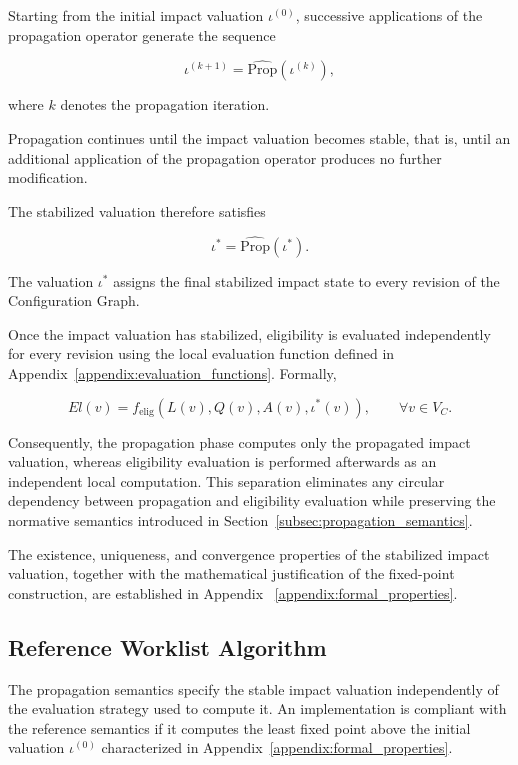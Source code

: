 \documentclass[10pt]{article}
\begin{document}
Starting from the initial impact valuation $\iota^{(0)}$, successive applications of the propagation operator generate the sequence

\begin{equation}
	\label{eq:impact_iteration}
	\iota^{(k+1)}
	=
	\widehat{\mathrm{Prop}}
	\!\left(
	\iota^{(k)}
	\right),
\end{equation}

where $k$ denotes the propagation iteration.

Propagation continues until the impact valuation becomes stable, that is, until an additional application of the propagation operator produces no further modification.

The stabilized valuation therefore satisfies

\begin{equation}
	\label{eq:impact_fixed_point}
	\iota^{*}
	=
	\widehat{\mathrm{Prop}}
	\!\left(
	\iota^{*}
	\right).
\end{equation}

The valuation $\iota^{*}$ assigns the final stabilized impact state to every
revision of the Configuration Graph.

Once the impact valuation has stabilized, eligibility is evaluated
independently for every revision using the local evaluation function defined in Appendix~\ref{appendix:evaluation_functions}. Formally,

\begin{equation}
	\label{eq:eligibility_after_propagation}
	El(v)
	=
	f_{\mathrm{elig}}
	\!\left(
	L(v),
	Q(v),
	A(v),
	\iota^{*}(v)
	\right),
	\qquad
	\forall v\in V_C.
\end{equation}

Consequently, the propagation phase computes only the propagated impact valuation, whereas eligibility evaluation is performed afterwards as an independent local computation. This separation eliminates any circular dependency between propagation and eligibility evaluation while preserving the normative semantics introduced in Section~\ref{subsec:propagation_semantics}.

The existence, uniqueness, and convergence properties of the stabilized impact valuation, together with the mathematical justification of the fixed-point construction, are established in Appendix ~\ref{appendix:formal_properties}.

\subsection{Reference Worklist Algorithm}
\label{appendix:ref_worklist_algo}
The propagation semantics specify the stable impact valuation independently of
the evaluation strategy used to compute it. An implementation is compliant with
the reference semantics if it computes the least fixed point above the initial
valuation $\iota^{(0)}$ characterized in
Appendix~\ref{appendix:formal_properties}.
\end{document}
